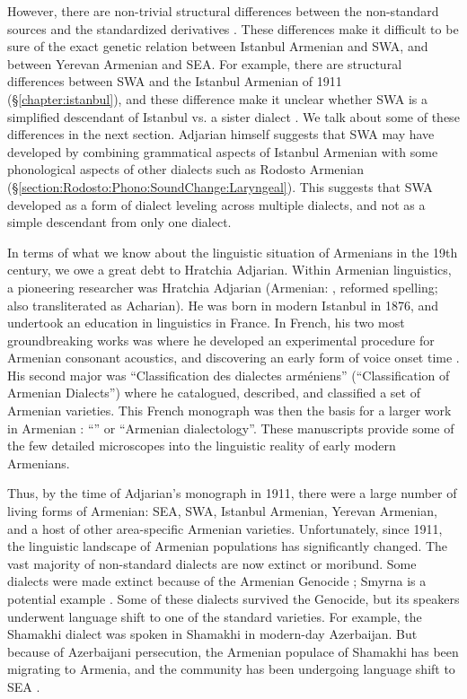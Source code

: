 However, there are non-trivial structural differences between the non-standard sources and the standardized derivatives \citep{SayeedVaux-2017-EvolutionArmenian}. These differences make it difficult to be sure of the exact genetic relation between Istanbul Armenian and SWA, and between Yerevan Armenian and SEA. For example, there are structural differences between SWA and the Istanbul Armenian of 1911 (\S\ref{chapter:istanbul}), and these difference make it unclear whether SWA is a simplified descendant of Istanbul vs. a sister dialect \citep[1148]{SayeedVaux-2017-EvolutionArmenian}. We talk about some of these differences in the next section. Adjarian himself suggests that SWA may have developed by combining grammatical aspects of Istanbul Armenian with some phonological aspects of other dialects such as Rodosto Armenian (\S\ref{section:Rodosto:Phono:SoundChange:Laryngeal}). This suggests that SWA developed as a form of dialect leveling across multiple dialects, and not as a simple descendant from only one dialect. 

In terms of what we know about the linguistic situation of Armenians in the 19th century, we owe a great debt to Hratchia Adjarian. Within Armenian linguistics, a pioneering researcher was Hratchia Adjarian (Armenian: , reformed spelling; also transliterated as Acharian). He was born in modern Istanbul in 1876, and undertook an education in linguistics in France. In French, his two most groundbreaking works was \citet{Adjarian-1899-ArmenianExplosives} where he developed an experimental procedure for Armenian consonant acoustics, and discovering an early form of voice onset time \citep{braun-2013-earlyCaseVOTAdjarian}. His second major was \citet{Adjarian-1909-ClassificationArmenianDialect} ``Classification des dialectes arméniens'' (``Classification of Armenian Dialects'') where he catalogued, described, and classified a set of Armenian varieties. This French monograph was then the basis for a larger work in Armenian \citep{Adjarian-1911-DialectologyBook}: ``'' or ``Armenian dialectology''. These manuscripts provide some of the few detailed microscopes into the linguistic reality of early modern Armenians. 

Thus, by the time of Adjarian's monograph in 1911, there were a large number of living forms of Armenian: SEA, SWA, Istanbul Armenian, Yerevan Armenian, and a host of other area-specific Armenian varieties. Unfortunately, since 1911, the linguistic landscape of Armenian populations has significantly changed. The vast majority of non-standard dialects are now extinct or moribund. Some dialects were made extinct because of the Armenian Genocide \citep{Katvalyan-2015-GenocideArmenianLanguage}; Smyrna is a potential example \citep{Vaux-2012-ArmenianSmyrna}. Some of these dialects survived the Genocide, but its speakers underwent language shift to one of the standard varieties. For example, the Shamakhi dialect was spoken in Shamakhi in modern-day Azerbaijan. But because of Azerbaijani persecution, the Armenian populace of Shamakhi has been migrating to Armenia, and the community has been undergoing language shift to SEA \citep{Vlasyan-2019-Shamakhi}. 

